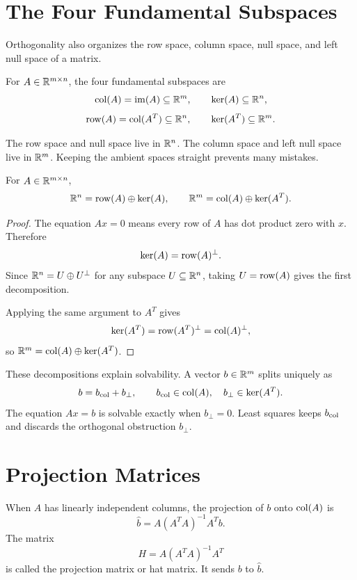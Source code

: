 \section{The Four Fundamental Subspaces}

Orthogonality also organizes the row space, column space, null space, and left
null space of a matrix.

\begin{definition}
For $A\in\mathbb{R}^{m\times n}$, the four fundamental subspaces are
\[
  \operatorname{col}(A)=\operatorname{im}(A)\subseteq\mathbb{R}^m,
  \qquad
  \operatorname{ker}(A)\subseteq\mathbb{R}^n,
\]
\[
  \operatorname{row}(A)=\operatorname{col}(A^T)\subseteq\mathbb{R}^n,
  \qquad
  \operatorname{ker}(A^T)\subseteq\mathbb{R}^m.
\]
\end{definition}

The row space and null space live in $\mathbb{R}^n$. The column space and left null
space live in $\mathbb{R}^m$. Keeping the ambient spaces straight prevents many
mistakes.

\begin{theorem}
For $A\in\mathbb{R}^{m\times n}$,
\[
  \mathbb{R}^n = \operatorname{row}(A)\oplus \operatorname{ker}(A),
  \qquad
  \mathbb{R}^m = \operatorname{col}(A)\oplus \operatorname{ker}(A^T).
\]
\end{theorem}

\begin{proof}
The equation $Ax=0$ means every row of $A$ has dot product zero with $x$.
Therefore
\[
  \operatorname{ker}(A)=\operatorname{row}(A)^\perp.
\]
Since $\mathbb{R}^n=U\oplus U^\perp$ for any subspace $U\subseteq\mathbb{R}^n$, taking
$U=\operatorname{row}(A)$ gives the first decomposition.

Applying the same argument to $A^T$ gives
\[
  \operatorname{ker}(A^T)=\operatorname{row}(A^T)^\perp=\operatorname{col}(A)^\perp,
\]
so $\mathbb{R}^m=\operatorname{col}(A)\oplus\operatorname{ker}(A^T)$.
\end{proof}

\begin{computebox}
These decompositions explain solvability. A vector $b\in\mathbb{R}^m$ splits uniquely
as
\[
  b=b_{\operatorname{col}}+b_{\perp},
  \qquad
  b_{\operatorname{col}}\in\operatorname{col}(A),\quad b_{\perp}\in\operatorname{ker}(A^T).
\]
The equation $Ax=b$ is solvable exactly when $b_{\perp}=0$. Least squares
keeps $b_{\operatorname{col}}$ and discards the orthogonal obstruction $b_{\perp}$.
\end{computebox}

\section{Projection Matrices}

When $A$ has linearly independent columns, the projection of $b$ onto
$\operatorname{col}(A)$ is
\[
  \hat{b}=A(A^TA)^{-1}A^Tb.
\]
The matrix
\[
  H=A(A^TA)^{-1}A^T
\]
is called the projection matrix or hat matrix. It sends $b$ to $\hat{b}$.

